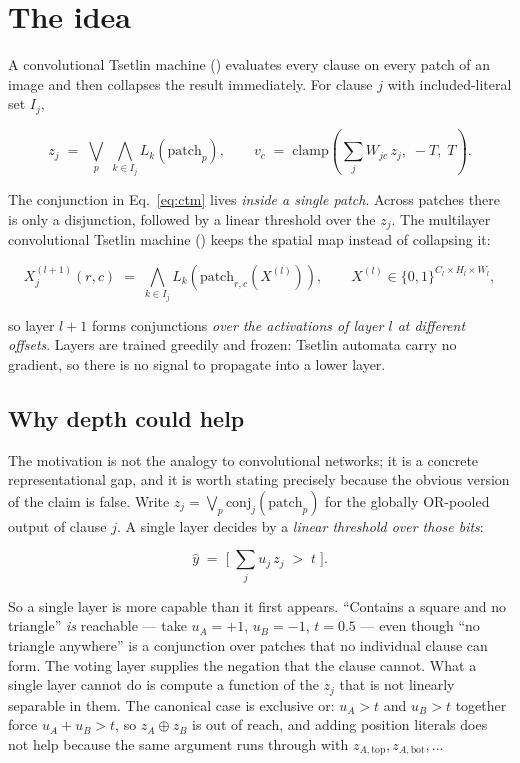 \section{The idea}
\label{sec:idea}

A convolutional Tsetlin machine (\ctm) evaluates every clause on every patch of an image
and then collapses the result immediately. For clause $j$ with included-literal set $I_j$,

\begin{equation}
  z_j \;=\; \bigvee_{p} \; \bigwedge_{k \in I_j} L_k\!\left(\text{patch}_p\right),
  \qquad
  v_c \;=\; \mathrm{clamp}\!\left( \sum_j W_{jc}\, z_j,\; -T,\; T \right).
  \label{eq:ctm}
\end{equation}

The conjunction in Eq.~\ref{eq:ctm} lives \emph{inside a single patch}. Across patches there
is only a disjunction, followed by a linear threshold over the $z_j$. The multilayer
convolutional Tsetlin machine (\mctm) keeps the spatial map instead of collapsing it:

\begin{equation}
  X^{(l+1)}_j(r,c) \;=\; \bigwedge_{k \in I_j} L_k\!\left(\text{patch}_{r,c}\!\left(X^{(l)}\right)\right),
  \qquad X^{(l)} \in \{0,1\}^{C_l \times H_l \times W_l},
  \label{eq:mctm}
\end{equation}

so layer $l+1$ forms conjunctions \emph{over the activations of layer $l$ at different
offsets}. Layers are trained greedily and frozen: Tsetlin automata carry no gradient, so
there is no signal to propagate into a lower layer.

\subsection{Why depth could help}

The motivation is not the analogy to convolutional networks; it is a concrete
representational gap, and it is worth stating precisely because the obvious version of the
claim is false. Write $z_j = \bigvee_p \mathrm{conj}_j(\text{patch}_p)$ for the globally
OR-pooled output of clause $j$. A single layer decides by a \emph{linear threshold over those
bits}:

\begin{equation}
  \hat{y} \;=\; \Big[\; \textstyle\sum_j u_j\, z_j \;>\; t \;\Big].
  \label{eq:onelayer}
\end{equation}

So a single layer is more capable than it first appears. ``Contains a square and no
triangle'' \emph{is} reachable --- take $u_A = +1$, $u_B = -1$, $t = 0.5$ --- even though
``no triangle anywhere'' is a conjunction over patches that no individual clause can form.
The voting layer supplies the negation that the clause cannot. What a single layer cannot do
is compute a function of the $z_j$ that is not linearly separable in them. The canonical case
is exclusive or: $u_A > t$ and $u_B > t$ together force $u_A + u_B > t$, so
$z_A \oplus z_B$ is out of reach, and adding position literals does not help because the same
argument runs through with $z_{A,\text{top}}, z_{A,\text{bot}}, \dots$

